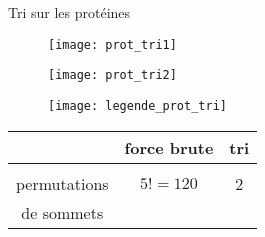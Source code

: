 \begin{frame}{Tri sur les protéines}
    \begin{multicols}{3}
    \begin{figure}[!htb]
        \centering
        \texttt{[image: prot\_tri1]}
    \end{figure}
    \begin{figure}[!htb]
        \centering
        \texttt{[image: prot\_tri2]}
    \end{figure}
    \begin{figure}[!htb]
        \centering
        \texttt{[image: legende\_prot\_tri]}
    \end{figure}
    \end{multicols}
    \vspace*{1cm}
    \begin{minipage}{0.8\textwidth}
    \begin{center}
        \begin{tabular}{c|c|c}
            & force brute & tri \\
            \hline
            & & \\
            permutations & $5!=120$ & 2 \\
            de sommets & &
        \end{tabular}
    \end{center}
\end{minipage}
\end{frame}

